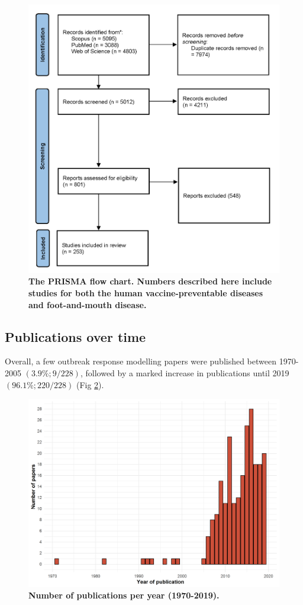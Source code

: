 \documentclass[10pt,letterpaper]{article}
\begin{document}
\begin{figure}[!h]
	\includegraphics[scale=0.85]{figs/fig1_PRISMA_flowchart}
	\caption{\bf The PRISMA flow chart. Numbers described here include studies for both the human vaccine-preventable diseases and foot-and-mouth disease.}
	\label{PRISMA_flowchart}
\end{figure}

\subsection*{Publications over time}
Overall, a few outbreak response modelling papers were published between 1970-2005 $(3.9\%; 9/228)$, followed by a marked increase in publications until 2019 $(96.1\%; 220/228)$ (Fig \ref{publications_per_year}). 

\begin{figure}[!h]	
 \includegraphics[scale=0.65]{figs/fig2_publications_per_year.png}
	\caption{\bf Number of publications per year (1970-2019).}
	\label{publications_per_year}
\end{figure}
\end{document}
